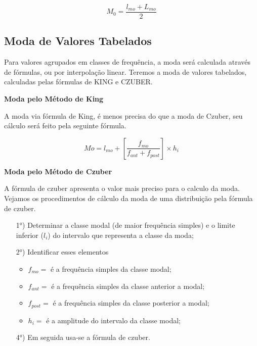 \begin{equation}\label{}
    M_{0}= \frac{l_{mo}+L_{mo}}{2}
\end{equation}


\subsection{Moda de Valores Tabelados}

\vskip0.3cm

Para valores agrupados em classes de frequência, a moda será calculada através de fórmulas, ou por interpolação linear. Teremos a moda de valores tabelados, calculadas pelas fórmulas de KING e CZUBER.
\vskip0.3cm


\textbf{Moda pelo Método de King}
\vskip0.3cm

A moda via fórmula de King, é menos precisa do que a moda de Czuber, seu cálculo será feito pela seguinte fórmula.


\begin{equation}\label{}
    Mo=l_{mo}+\left[\frac{f_{mo}}{f_{ant}+f_{post}}\right]\times h_{i}
\end{equation}

\textbf{Moda pelo Método de Czuber}
\vskip0.3cm

A fórmula de czuber apresenta o valor mais preciso para o calculo da moda. Vejamos os procedimentos
de cálculo da moda de uma distribuição pela fórmula de czuber.


\begin{enumerate}
\item [{1°)}] Determinar a classe modal (de maior frequência simples) e o limite inferior ($l_{i}$) do intervalo que representa a classe da moda;
\item [{2°)}] Identificar esses elementos
\begin{itemize}
   \item $f_{mo}=$ é a frequência simples da classe modal;
   \item $f_{ant}=$ é a frequência simples da classe anterior a modal;
   \item $f_{post}=$ é a frequência simples da classe posterior a modal;
   \item $h_{i}=$ é a amplitude do intervalo da classe modal;
 \end{itemize}
\item [{4°)}] Em seguida usa-se a fórmula de czuber.
\end{enumerate}

